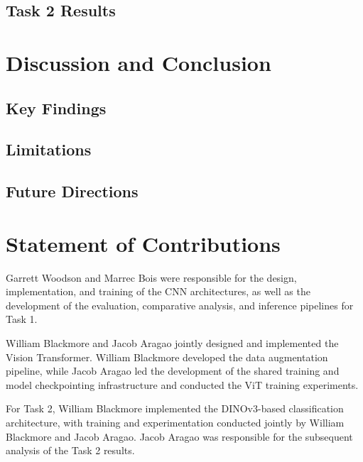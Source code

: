\documentclass[conference]{IEEEtran}
\begin{document}
\subsection{Task 2 Results}



\section{Discussion and Conclusion}
\label{sec:discussion}

\subsection{Key Findings}

\subsection{Limitations}

\subsection{Future Directions}



\section{Statement of Contributions}
\label{sec:contributions}

Garrett Woodson and Marrec Bois were responsible for the
design, implementation, and training of the CNN architectures,
as well as the development of the evaluation, comparative
analysis, and inference pipelines for Task 1.

William Blackmore and Jacob Aragao jointly designed and
implemented the Vision Transformer. William Blackmore
developed the data augmentation pipeline, while Jacob Aragao
led the development of the shared training and model
checkpointing infrastructure and conducted the ViT training
experiments.

For Task 2, William Blackmore implemented the DINOv3-based
classification architecture, with training and experimentation
conducted jointly by William Blackmore and Jacob Aragao.
Jacob Aragao was responsible for the subsequent analysis
of the Task 2 results.
\end{document}

